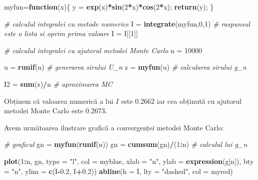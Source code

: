 \documentclass[]{article}
\newenvironment{Shaded}{\begin{snugshade}}{\end{snugshade}}
\newcommand{\KeywordTok}[1]{\textcolor[rgb]{0.13,0.29,0.53}{\textbf{#1}}}
\newcommand{\DataTypeTok}[1]{\textcolor[rgb]{0.13,0.29,0.53}{#1}}
\newcommand{\DecValTok}[1]{\textcolor[rgb]{0.00,0.00,0.81}{#1}}
\newcommand{\FloatTok}[1]{\textcolor[rgb]{0.00,0.00,0.81}{#1}}
\newcommand{\StringTok}[1]{\textcolor[rgb]{0.31,0.60,0.02}{#1}}
\newcommand{\CommentTok}[1]{\textcolor[rgb]{0.56,0.35,0.01}{\textit{#1}}}
\newcommand{\ControlFlowTok}[1]{\textcolor[rgb]{0.13,0.29,0.53}{\textbf{#1}}}
\newcommand{\OperatorTok}[1]{\textcolor[rgb]{0.81,0.36,0.00}{\textbf{#1}}}
\newcommand{\NormalTok}[1]{#1}
\begin{document}
\begin{Shaded}
\begin{Highlighting}[]
\NormalTok{myfun=}\ControlFlowTok{function}\NormalTok{(x)\{}
\NormalTok{  y =}\StringTok{ }\KeywordTok{exp}\NormalTok{(x)}\OperatorTok{*}\KeywordTok{sin}\NormalTok{(}\DecValTok{2}\OperatorTok{*}\NormalTok{x)}\OperatorTok{*}\KeywordTok{cos}\NormalTok{(}\DecValTok{2}\OperatorTok{*}\NormalTok{x);}
  \KeywordTok{return}\NormalTok{(y);}
\NormalTok{\}}

\CommentTok{# calculul integralei cu metode numerice}
\NormalTok{I =}\StringTok{ }\KeywordTok{integrate}\NormalTok{(myfun,}\DecValTok{0}\NormalTok{,}\DecValTok{1}\NormalTok{) }\CommentTok{# raspunsul este o lista si oprim prima valoare}
\NormalTok{I =}\StringTok{ }\NormalTok{I[[}\DecValTok{1}\NormalTok{]]}

\CommentTok{# calculul integralei cu ajutorul metodei Monte Carlo}
\NormalTok{n =}\StringTok{ }\DecValTok{10000} 

\NormalTok{u =}\StringTok{ }\KeywordTok{runif}\NormalTok{(n) }\CommentTok{# generarea sirului U_n}
\NormalTok{z =}\StringTok{ }\KeywordTok{myfun}\NormalTok{(u) }\CommentTok{# calcularea sirului g_n}

\NormalTok{I2 =}\StringTok{ }\KeywordTok{sum}\NormalTok{(z)}\OperatorTok{/}\NormalTok{n }\CommentTok{# aproximarea MC}
\end{Highlighting}
\end{Shaded}

Obținem că valoarea numerică a lui \(I\) este 0.2662 iar cea obținută cu
ajutorul metodei Monte Carlo este 0.2673.

Avem următoarea ilustrare grafică a convergenței metodei Monte Carlo:

\begin{Shaded}
\begin{Highlighting}[]
\CommentTok{# graficul}
\NormalTok{gn =}\StringTok{ }\KeywordTok{myfun}\NormalTok{(}\KeywordTok{runif}\NormalTok{(n)) }
\NormalTok{gn =}\StringTok{ }\KeywordTok{cumsum}\NormalTok{(gn)}\OperatorTok{/}\NormalTok{(}\DecValTok{1}\OperatorTok{:}\NormalTok{n) }\CommentTok{# calculul lui g_n}

\KeywordTok{plot}\NormalTok{(}\DecValTok{1}\OperatorTok{:}\NormalTok{n, gn, }\DataTypeTok{type =} \StringTok{"l"}\NormalTok{, }
     \DataTypeTok{col =}\NormalTok{ myblue, }\DataTypeTok{xlab =} \StringTok{"n"}\NormalTok{, }
     \DataTypeTok{ylab =} \KeywordTok{expression}\NormalTok{(g[n]),}
     \DataTypeTok{bty =} \StringTok{"n"}\NormalTok{,}
     \DataTypeTok{ylim =} \KeywordTok{c}\NormalTok{(I}\OperatorTok{-}\FloatTok{0.2}\NormalTok{, I}\OperatorTok{+}\FloatTok{0.2}\NormalTok{))}
\KeywordTok{abline}\NormalTok{(}\DataTypeTok{h =}\NormalTok{ I, }\DataTypeTok{lty =} \StringTok{"dashed"}\NormalTok{, }\DataTypeTok{col =}\NormalTok{ myred)}
\end{Highlighting}
\end{Shaded}
\end{document}
